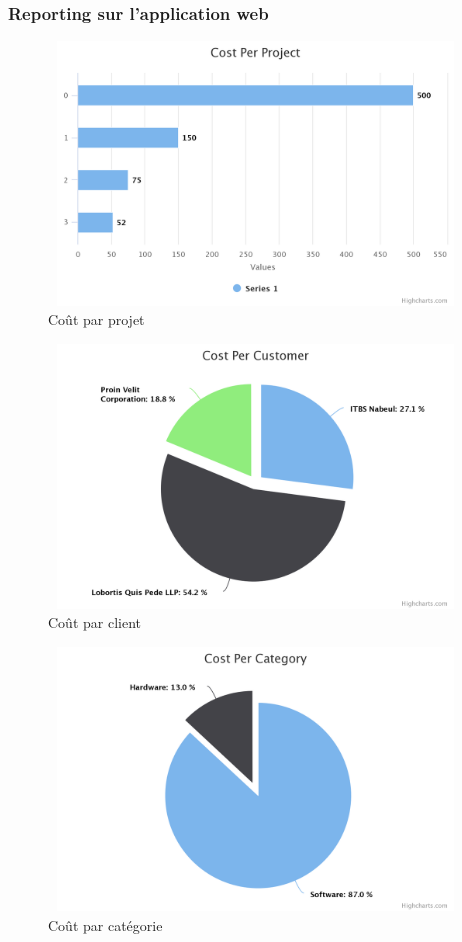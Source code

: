 \subsubsection{Reporting sur l'application web}

\begin{figure}[H]
\center
\includegraphics[width=11cm,height=7cm]{./figures/pres/cost-per-project.png}
\caption{ Co\^{u}t par projet }
\end{figure}



\begin{figure}[H]
\center
\includegraphics[width=11cm,height=7cm]{./figures/pres/cost-per-customer.png}
\caption{ Co\^{u}t par client }
\end{figure}

\begin{figure}[H]
\center
\includegraphics[width=11cm,height=7cm]{./figures/pres/cost-per-category.png}
\caption{ Co\^{u}t par cat\'{e}gorie}
\end{figure}



